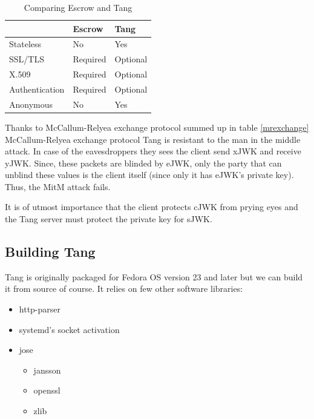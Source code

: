 \begin{table}[h]
\centering
\label{compare}
\begin{tabular}{@{}lll@{}}
\toprule
               & Escrow   & Tang                         \\ \midrule
Stateless      & No       & Yes                          \\
SSL/TLS        & Required & Optional                     \\
X.509          & Required & Optional                     \\
Authentication & Required & Optional                     \\
Anonymous      & No       & Yes                          \\ \bottomrule
\end{tabular}
\caption{Comparing Escrow and Tang}
\end{table}

Thanks to McCallum-Relyea exchange protocol summed up in table \ref{mrexchange} McCallum-Relyea exchange protocol Tang is resistant to the man in the middle attack.
In case of the eavesdroppers they sees the client send xJWK and receive yJWK.
Since, these packets are blinded by eJWK, only the party that can unblind these values is the client itself (since only it has eJWK's private key).
Thus, the MitM attack fails.

It is of utmost importance that the client protects cJWK from prying eyes and the Tang server must protect the private key for sJWK.



\subsection{Building Tang}

Tang is originally packaged for Fedora OS version 23 and later but we can build it from source of course.
It relies on few other software libraries:
\label{dependencies}
\begin{itemize}
\item http-parser
\item systemd's socket activation
\item jose
    \begin{itemize}
    \item jansson
    \item openssl
    \item zlib
    \end{itemize}
\end{itemize}

